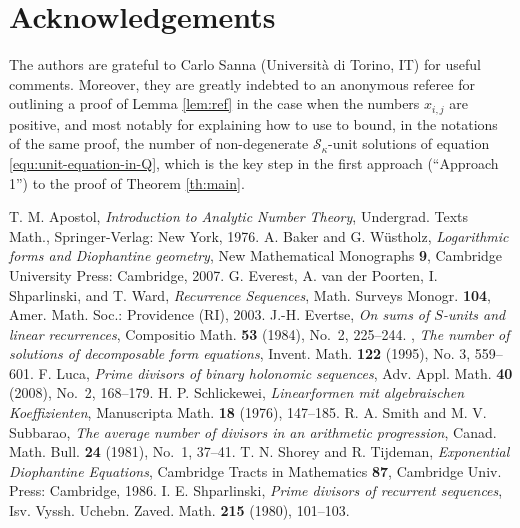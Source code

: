 \documentclass[reqno]{amsart}
\theoremstyle{remark}
\begin{document}
\section*{Acknowledgements}
\label{subsec:acks}
%
The authors are grateful to Carlo Sanna (Universit\`a di Torino, IT) for useful comments. Moreover, they are greatly indebted to an anonymous referee for outlining a proof of Lemma \ref{lem:ref} in the case when the numbers $x_{i,j}$ are positive, and most notably for explaining how to use \cite[Theorem 3]{Ev95} to bound, in the notations of the same proof, the number of non-degenerate $\mathcal S_\kappa$-unit solutions of equation \eqref{equ:unit-equation-in-Q}, which is the key step in the first approach (``Approach 1'') to the proof of Theorem \ref{th:main}.
%
%
\begin{thebibliography}{99}
%
 T. M. Apostol, \textit{Introduction to Analytic Number Theory}, Undergrad. Texts Math., Springer-Verlag: New York, 1976.
%
 A. Baker and G. W\"ustholz, \textit{Logarithmic forms and Diophantine geometry}, New Mathematical Monographs \textbf{9}, Cambridge University Press: Cambridge, 2007.
%
 G. Everest, A. van der Poorten, I. Shparlinski, and T. Ward, \textit{Recurrence Sequences}, Math. Surveys Monogr. \textbf{104}, Amer. Math. Soc.: Providence (RI), 2003.
%
 J.-H. Evertse, \textit{On sums of $S$-units and linear recurrences}, Compositio Math. \textbf{53} (1984), No.~2, 225--244.
%
 \bysame, \textit{The number of solutions of decomposable form equations}, Invent. Math. \textbf{122} (1995), No. 3, 559--601. %
%
 F. Luca, \textit{Prime divisors of binary holonomic sequences}, Adv. Appl. Math. \textbf{40} (2008), No.~2, 168--179.
%
%
 H. P. Schlickewei, \textit{Linearformen mit algebraischen Koeffizienten}, Manuscripta Math. \textbf{18} (1976), 147--185.
%
 R. A. Smith and M. V. Subbarao, \textit{The average number of divisors in an arithmetic progression}, Canad. Math. Bull. \textbf{24} (1981), No.~1, 37--41.
%
 T. N. Shorey and R. Tijdeman, \textit{Exponential Diophantine Equations}, Cambridge Tracts in Mathematics \textbf{87}, Cambridge Univ. Press: Cambridge, 1986.
%
 I. E. Shparlinski, \textit{Prime divisors of recurrent sequences}, Isv. Vyssh. Uchebn. Zaved. Math. \textbf{215} (1980), 101--103.

\end{thebibliography}
\end{document}
